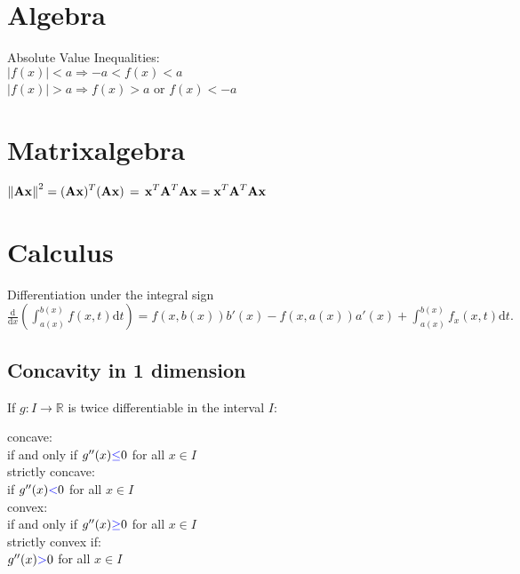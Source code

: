 \section{Algebra}
Absolute Value Inequalities:\\
$ |f(x)| < a  \Rightarrow  -a < f(x) < a$\\ 
$|f(x)| > a  \Rightarrow f(x) > a$ or $f(x) < -a$\\
\section{Matrixalgebra}

$\displaystyle  \displaystyle \left\lVert \mathbf{A}\mathbf{x}\right\rVert ^2 = \displaystyle (\mathbf{A}\mathbf{x})^ T(\mathbf{A}\mathbf{x})\, =\, \mathbf{x}^ T\mathbf{A}^ T\mathbf{A}\mathbf{x} = \displaystyle \mathbf{x}^ T\mathbf{A}^ T\mathbf{A}\mathbf{x}\qquad$

\section{Calculus}

Differentiation under the integral sign\\
$\frac{\text{d}}{\text{d}x}\left( \int_{a(x)}^{b(x)}f(x,t)\text{d}t \right ) = f(x,b(x))b'(x)-f(x,a(x))a'(x)+\int_{a(x)}^{b(x)}f_x(x,t)\text{d}t.$

\subsection*{Concavity in 1 dimension}
If $g:I \to \mathbb {R}$ is twice differentiable in the interval $I$:

concave:\\ 
if and only if $g^{\prime \prime }(x) {\color{blue}{\leq }}  0$ for all $x \in I$\\

strictly concave:\\
if $g^{\prime \prime }(x) {\color{blue}{<}}  0$ for all $x \in I$\\

convex:\\ 
if and only if $g^{\prime \prime }(x) {\color{blue}{\geq }}  0$ for all $x \in I$\\

strictly convex if:\\
$g^{\prime \prime }(x) {\color{blue}{>}}  0$ for all $x \in I$\\

